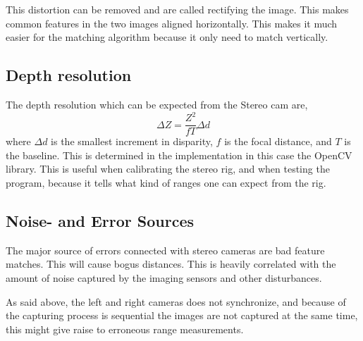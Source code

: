 This distortion can be removed and are called rectifying the image. This makes common
features in the two images aligned horizontally. This makes it much easier for the matching
algorithm because it only need to match vertically.


\subsection{Depth resolution}
The depth resolution which can be expected from the Stereo cam are,
\begin{equation}
    \Delta Z = \frac{Z^2}{f T}\Delta d
\end{equation}
where $\Delta d$ is the smallest increment in disparity, $f$ is the focal distance, and
$T$ is the baseline. This is determined in the implementation in this case the OpenCV
library. This is useful when calibrating the stereo rig, and when testing the program,
because it tells what kind of ranges one can expect from the rig.


\subsection{Noise- and Error Sources}
The major source of errors connected with stereo cameras are bad feature matches. This
will cause bogus distances. This is heavily correlated with the amount of noise captured
by the imaging sensors and other disturbances.

As said above, the left and right cameras does not synchronize, and because of the
capturing process is sequential the images are not captured at the same time, this might
give raise to erroneous range measurements. 




